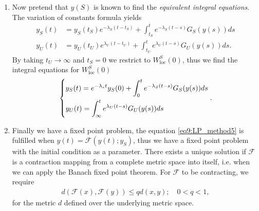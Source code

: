 \begin{enumerate}
\item Now pretend that $y(S)$ is known to find the \emph{equivalent integral equations}. The variation of constants formula yields
	\begin{subequations}
	\begin{align}
		y_{S}(t) &= y_{S}(t_S) e^{- \lambda _{S}(t - t_S)} + \int_{t_S}^{t} e^{-\lambda _{S}(t-s)} G_{S}(y(s)) ds \\
		y_{U}(t) &= y_{U}(t_U) e^{ \lambda _{U}(t - t_U)} + \int_{t_U}^{t} e^{\lambda _{U}(t-s)} G_{U}(y(s)) ds. 
	\end{align}
	\end{subequations}
	By taking $t_{U}\to \infty $ and $t_{S}=0$ we restrict to $W^{S}_{ \textrm{loc} }(0)$, thus we find the integral equations for $W^{S}_{ \textrm{loc} }(0)$
	\begin{align}
		\begin{dcases}
		y_{S}(t) = e^{- \lambda _{s}t}y_{S}(0) + \int_{0}^{t} e^{-\lambda _{S}(t-s)}G_{S}(y(s))ds \\
		y_{U}(t) = \int_{\infty }^{t} e^{\lambda_{U}(t-s)}G_{U}(y(s))ds
		\end{dcases}
		.\label{eq9:LP_method5}		
	\end{align}
\item Finally we have a fixed point problem, the equation \eqref{eq9:LP_method5} is fulfilled when $y(t) = \mathcal{F}(y(t);y_S)$, thus we have a fixed point problem with the initial condition as a parameter. There exists a unique solution if $\mathcal{F}$ is a contraction mapping from a complete metric space into itself, i.e. when we can apply the Banach fixed point theorem. For $\mathcal{F}$ to be contracting, we require
	\begin{align}
		d(\mathcal{F}(x), \mathcal{F}(y)) \leq q d(x,y);\quad 0 < q < 1,
	\end{align}
for the metric $d$ defined over the underlying metric space.


\end{enumerate}
